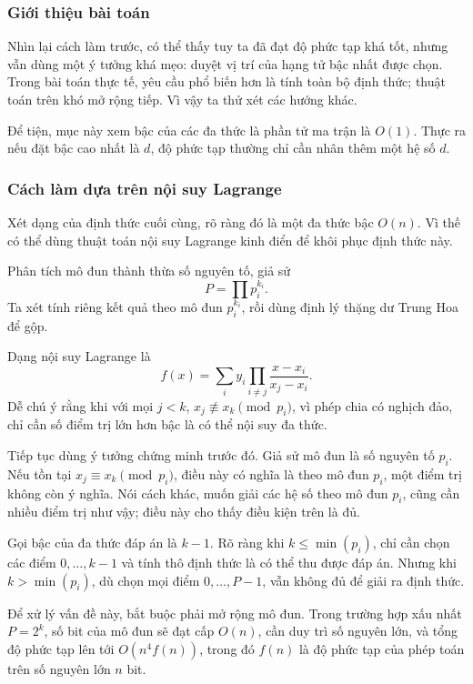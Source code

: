 \documentclass[11pt]{article}
\begin{document}
\subsubsection{Giới thiệu bài toán}

Nhìn lại cách làm trước, có thể thấy tuy ta đã đạt độ phức tạp khá tốt, nhưng
vẫn dùng một ý tưởng khá mẹo: duyệt vị trí của hạng tử bậc nhất được chọn. Trong
bài toán thực tế, yêu cầu phổ biến hơn là tính toàn bộ định thức; thuật toán
trên khó mở rộng tiếp. Vì vậy ta thử xét các hướng khác.

Để tiện, mục này xem bậc của các đa thức là phần tử ma trận là \(O(1)\). Thực
ra nếu đặt bậc cao nhất là \(d\), độ phức tạp thường chỉ cần nhân thêm một hệ số
\(d\).

\subsubsection{Cách làm dựa trên nội suy Lagrange}

Xét dạng của định thức cuối cùng, rõ ràng đó là một đa thức bậc \(O(n)\). Vì thế
có thể dùng thuật toán nội suy Lagrange kinh điển để khôi phục định thức này.

Phân tích mô đun thành thừa số nguyên tố, giả sử
\[
  P=\prod p_i^{k_i}.
\]
Ta xét tính riêng kết quả theo mô đun \(p_i^{k_i}\), rồi dùng định lý thặng dư
Trung Hoa để gộp.

Dạng nội suy Lagrange là
\[
  f(x)=\sum_i y_i\prod_{i\ne j}\frac{x-x_i}{x_j-x_i}.
\]
Dễ chú ý rằng khi với mọi \(j<k\), \(x_j\not\equiv x_k\pmod {p_i}\), vì phép
chia có nghịch đảo, chỉ cần số điểm trị lớn hơn bậc là có thể nội suy đa thức.

Tiếp tục dùng ý tưởng chứng minh trước đó. Giả sử mô đun là số nguyên tố \(p_i\).
Nếu tồn tại \(x_j\equiv x_k\pmod {p_i}\), điều này có nghĩa là theo mô đun
\(p_i\), một điểm trị không còn ý nghĩa. Nói cách khác, muốn giải các hệ số theo
mô đun \(p_i\), cũng cần nhiều điểm trị như vậy; điều này cho thấy điều kiện
trên là đủ.

Gọi bậc của đa thức đáp án là \(k-1\). Rõ ràng khi \(k\le \min(p_i)\), chỉ cần
chọn các điểm \(0,\ldots,k-1\) và tính thô định thức là có thể thu được đáp án.
Nhưng khi \(k>\min(p_i)\), dù chọn mọi điểm \(0,\ldots,P-1\), vẫn không đủ để
giải ra định thức.

Để xử lý vấn đề này, bắt buộc phải mở rộng mô đun. Trong trường hợp xấu nhất
\(P=2^k\), số bit của mô đun sẽ đạt cấp \(O(n)\), cần duy trì số nguyên lớn, và
tổng độ phức tạp lên tới \(O(n^4 f(n))\), trong đó \(f(n)\) là độ phức tạp của
phép toán trên số nguyên lớn \(n\) bit.
\end{document}
